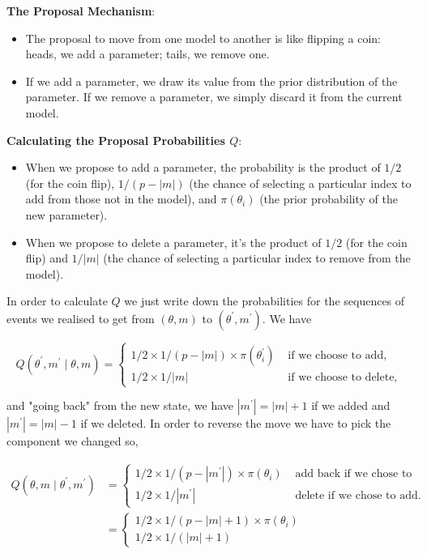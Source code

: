 \documentclass[10pt]{article}
\begin{document}
\textbf{The Proposal Mechanism}:

\begin{itemize}
  \item The proposal to move from one model to another is like flipping a coin: heads, we add a parameter; tails, we remove one.
  \item If we add a parameter, we draw its value from the prior distribution of the parameter. If we remove a parameter, we simply discard it from the current model.
\end{itemize}

\textbf{Calculating the Proposal Probabilities \( Q \)}:

\begin{itemize}
  \item When we propose to add a parameter, the probability is the product of \( 1/2 \) (for the coin flip), \( 1/(p - |m|) \) (the chance of selecting a particular index to add from those not in the model), and \( \pi(\theta_i) \) (the prior probability of the new parameter).
  \item When we propose to delete a parameter, it's the product of \( 1/2 \) (for the coin flip) and \( 1/|m| \) (the chance of selecting a particular index to remove from the model).
\end{itemize}

In order to calculate $Q$ we just write down the probabilities for the sequences of events we realised to get from $(\theta, m)$ to $\left(\theta^{\prime}, m^{\prime}\right)$. We have

$$
Q\left(\theta^{\prime}, m^{\prime} \mid \theta, m\right)=\left\{\begin{array}{cl}
1 / 2 \times 1 /(p-|m|) \times \pi\left(\theta_i^{\prime}\right) & \text { if we choose to add, } \\
1 / 2 \times 1 /|m| & \text { if we choose to delete, }
\end{array}\right.
$$

and "going back" from the new state, we have $\left|m^{\prime}\right|=|m|+1$ if we added and $\left|m^{\prime}\right|=|m|-1$ if we deleted. In order to reverse the move we have to pick the component we changed so,

$$
\begin{aligned}
Q\left(\theta, m \mid \theta^{\prime}, m^{\prime}\right) & =\left\{\begin{array}{cl}
1 / 2 \times 1 /\left(p-\left|m^{\prime}\right|\right) \times \pi\left(\theta_i\right) & \text { add back if we chose to delete } \\
1 / 2 \times 1 /\left|m^{\prime}\right| & \text { delete if we chose to add. }
\end{array}\right. \\
& =\left\{\begin{array}{c}
1 / 2 \times 1 /(p-|m|+1) \times \pi\left(\theta_i\right) \\
1 / 2 \times 1 /(|m|+1)
\end{array}\right.
\end{aligned}
$$
\end{document}
